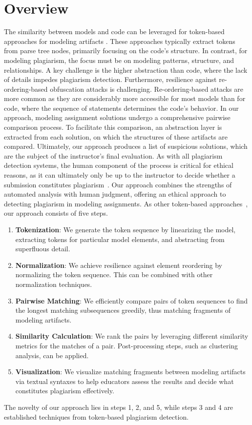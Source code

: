 \section{Overview}\label{sec:mde-approach-overview}
The similarity between models and code can be leveraged for token-based approaches for modeling artifacts \cite{Saglam2022}.
These approaches typically extract tokens from parse tree nodes, primarily focusing on the code's structure.
In contrast, for modeling plagiarism, the focus must be on modeling patterns, structure, and relationships.
A key challenge is the higher abstraction than code, where the lack of details impedes plagiarism detection.
Furthermore, resilience against re-ordering-based obfuscation attacks is challenging.
Re-ordering-based attacks are more common \cite{Saglam2023} as they are considerably more accessible for most models than for code, where the sequence of statements determines the code's behavior.
In our approach, modeling assignment solutions undergo a comprehensive pairwise comparison process.
To facilitate this comparison, an abstraction layer is extracted from each solution, on which the structures of these artifacts are compared.
Ultimately, our approach produces a list of suspicious solutions, which are the subject of the instructor's final evaluation.
As with all plagiarism detection systems, the human component of the process is critical for ethical reasons, as it can ultimately only be up to the instructor to decide whether a submission constitutes plagiarism~\cite{Culwin2001, Weber2019}.
Our approach combines the strengths of automated analysis with human judgment, offering an ethical approach to detecting plagiarism in modeling assignments.
%
As other token-based approaches~\cite{prechelt2002, Maertens2022}, our approach consists of five steps.
\begin{enumerate}%
    \item \textbf{Tokenization}: We generate the token sequence by linearizing the model, extracting tokens for particular model elements, and abstracting from superfluous detail.
    \item \textbf{Normalization}: We achieve resilience against element reordering by normalizing the token sequence. This can be combined with other normalization techniques.
    \item \textbf{Pairwise Matching}: We efficiently compare pairs of token sequences to find the longest matching subsequences greedily, thus matching fragments of modeling artifacts.
    \item \textbf{Similarity Calculation}: We rank the pairs by leveraging different similarity metrics for the matches of a pair. Post-processing steps, such as clustering analysis, can be applied.
    \item \textbf{Visualization}: We visualize matching fragments between modeling artifacts via textual syntaxes to help educators assess the results and decide what constitutes plagiarism effectively.
\end{enumerate}
The novelty of our approach lies in steps 1, 2, and 5, while steps 3 and 4 are established techniques from token-based plagiarism detection.

